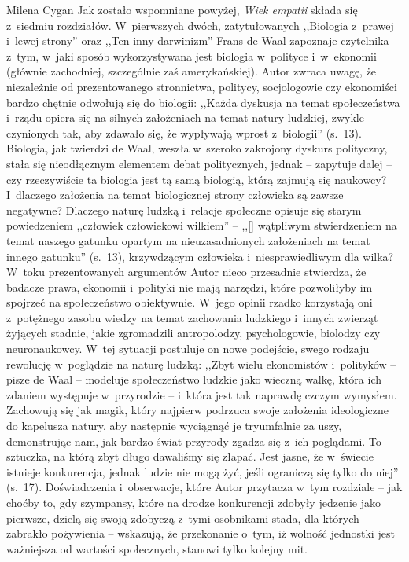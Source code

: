 \begin{recplenv}{Milena Cygan}
Jak zostało wspomniane powyżej, \textit{Wiek empatii} składa się z~siedmiu rozdziałów. W~pierwszych dwóch,
zatytułowanych ,,Biologia z~prawej i~lewej strony'' oraz ,,Ten inny darwinizm'' Frans de Waal zapoznaje
czytelnika z~tym, w~jaki sposób wykorzystywana jest biologia w~polityce i~w~ekonomii (głównie zachodniej,
szczególnie zaś amerykańskiej).
Autor zwraca uwagę, że niezależnie od prezentowanego stronnictwa, politycy, socjologowie czy ekonomiści bardzo chętnie
odwołują się do biologii: ,,Każda dyskusja na temat społeczeństwa i~rządu opiera się na silnych założeniach na temat
natury ludzkiej, zwykle czynionych tak, aby zdawało się, że wypływają wprost z~biologii'' (s.~13). Biologia, jak
twierdzi de Waal, weszła w~szeroko zakrojony dyskurs polityczny, stała się nieodłącznym elementem debat politycznych,
jednak -- zapytuje dalej -- czy rzeczywiście ta biologia jest tą samą biologią, którą zajmują się naukowcy? I~dlaczego
założenia na temat biologicznej strony człowieka są zawsze negatywne? Dlaczego naturę ludzką i~relacje społeczne
opisuje się starym powiedzeniem ,,człowiek człowiekowi wilkiem'' -- ,,[\mydots] wątpliwym stwierdzeniem na temat naszego gatunku
opartym na nieuzasadnionych założeniach na temat innego gatunku'' (s.~13), krzywdzącym człowieka i~niesprawiedliwym dla
wilka? W~toku prezentowanych argumentów Autor nieco przesadnie stwierdza, że badacze prawa, ekonomii i~polityki nie
mają narzędzi, które pozwoliłyby im spojrzeć na społeczeństwo obiektywnie. W~jego opinii rzadko korzystają
oni z~potężnego zasobu wiedzy na temat zachowania ludzkiego i~innych zwierząt żyjących stadnie, jakie zgromadzili
antropolodzy, psychologowie, biolodzy czy neuronaukowcy. W~tej sytuacji postuluje on nowe podejście, swego rodzaju
rewolucję w~poglądzie na naturę ludzką: ,,Zbyt wielu ekonomistów i~polityków -- pisze de Waal -- modeluje społeczeństwo
ludzkie jako wieczną walkę, która ich zdaniem występuje w~przyrodzie -- i~która jest tak naprawdę czczym wymysłem.
Zachowują się jak magik, który najpierw podrzuca swoje założenia ideologiczne do kapelusza natury, aby następnie
wyciągnąć je tryumfalnie za uszy, demonstrując nam, jak bardzo świat przyrody zgadza się z~ich poglądami. To sztuczka,
na którą zbyt długo dawaliśmy się złapać. Jest jasne, że w~świecie istnieje konkurencja, jednak ludzie nie mogą żyć,
jeśli ograniczą się tylko do niej'' (s.~17). Doświadczenia i~obserwacje, które Autor przytacza w~tym rozdziale -- jak
choćby to, gdy szympansy, które na drodze konkurencji zdobyły jedzenie jako pierwsze, dzielą się swoją zdobyczą z~tymi
osobnikami stada, dla których zabrakło pożywienia -- wskazują, że przekonanie o~tym, iż wolność jednostki jest
ważniejsza od wartości społecznych, stanowi tylko kolejny mit.


\end{recplenv}
